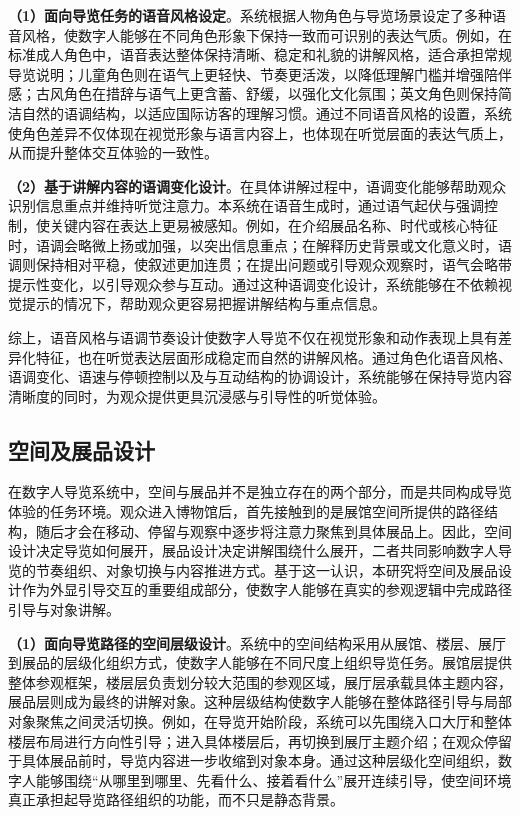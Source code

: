 \textbf{（1）面向导览任务的语音风格设定}。系统根据人物角色与导览场景设定了多种语音风格，使数字人能够在不同角色形象下保持一致而可识别的表达气质。例如，在标准成人角色中，语音表达整体保持清晰、稳定和礼貌的讲解风格，适合承担常规导览说明；儿童角色则在语气上更轻快、节奏更活泼，以降低理解门槛并增强陪伴感；古风角色在措辞与语气上更含蓄、舒缓，以强化文化氛围；英文角色则保持简洁自然的语调结构，以适应国际访客的理解习惯。通过不同语音风格的设置，系统使角色差异不仅体现在视觉形象与语言内容上，也体现在听觉层面的表达气质上，从而提升整体交互体验的一致性。

\textbf{（2）基于讲解内容的语调变化设计}。在具体讲解过程中，语调变化能够帮助观众识别信息重点并维持听觉注意力。本系统在语音生成时，通过语气起伏与强调控制，使关键内容在表达上更易被感知。例如，在介绍展品名称、时代或核心特征时，语调会略微上扬或加强，以突出信息重点；在解释历史背景或文化意义时，语调则保持相对平稳，使叙述更加连贯；在提出问题或引导观众观察时，语气会略带提示性变化，以引导观众参与互动。通过这种语调变化设计，系统能够在不依赖视觉提示的情况下，帮助观众更容易把握讲解结构与重点信息。

综上，语音风格与语调节奏设计使数字人导览不仅在视觉形象和动作表现上具有差异化特征，也在听觉表达层面形成稳定而自然的讲解风格。通过角色化语音风格、语调变化、语速与停顿控制以及与互动结构的协调设计，系统能够在保持导览内容清晰度的同时，为观众提供更具沉浸感与引导性的听觉体验。

\subsection{空间及展品设计}
在数字人导览系统中，空间与展品并不是独立存在的两个部分，而是共同构成导览体验的任务环境。观众进入博物馆后，首先接触到的是展馆空间所提供的路径结构，随后才会在移动、停留与观察中逐步将注意力聚焦到具体展品上。因此，空间设计决定导览如何展开，展品设计决定讲解围绕什么展开，二者共同影响数字人导览的节奏组织、对象切换与内容推进方式。基于这一认识，本研究将空间及展品设计作为外显引导交互的重要组成部分，使数字人能够在真实的参观逻辑中完成路径引导与对象讲解。

\textbf{（1）面向导览路径的空间层级设计}。系统中的空间结构采用从展馆、楼层、展厅到展品的层级化组织方式，使数字人能够在不同尺度上组织导览任务。展馆层提供整体参观框架，楼层层负责划分较大范围的参观区域，展厅层承载具体主题内容，展品层则成为最终的讲解对象。这种层级结构使数字人能够在整体路径引导与局部对象聚焦之间灵活切换。例如，在导览开始阶段，系统可以先围绕入口大厅和整体楼层布局进行方向性引导；进入具体楼层后，再切换到展厅主题介绍；在观众停留于具体展品前时，导览内容进一步收缩到对象本身。通过这种层级化空间组织，数字人能够围绕“从哪里到哪里、先看什么、接着看什么”展开连续引导，使空间环境真正承担起导览路径组织的功能，而不只是静态背景。

